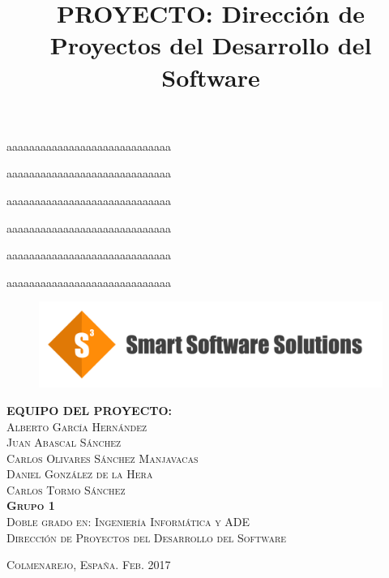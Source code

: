 \title{PROYECTO: Dirección de Proyectos del Desarrollo del Software} %

\begin{titlingpage}
\begin{center}


\color{fondo}
\par aaaaaaaaaaaaaaaaaaaaaaaaaaaaa
\par aaaaaaaaaaaaaaaaaaaaaaaaaaaaa
\par aaaaaaaaaaaaaaaaaaaaaaaaaaaaa
\par aaaaaaaaaaaaaaaaaaaaaaaaaaaaa
\par aaaaaaaaaaaaaaaaaaaaaaaaaaaaa
\par aaaaaaaaaaaaaaaaaaaaaaaaaaaaa

\color{principal}

\begin{figure}[h]
\begin{center}
\includegraphics[width=1\textwidth]{s3long}
\end{center}
\end{figure}

\vfill

\textsc{\LARGE \textbf{EQUIPO DEL PROYECTO:}}\\[2em]
\textsc{\Large Alberto García Hernández}\\[1em]
\textsc{\Large Juan Abascal Sánchez}\\[1em]
\textsc{\Large Carlos Olivares Sánchez Manjavacas}\\[1em]
\textsc{\Large Daniel González de la Hera}\\[1em]
\textsc{\Large Carlos Tormo Sánchez}\\[10em]

\textsc{\large \textbf{Grupo 1}}\\[1em]

\textsc{Doble grado en: Ingeniería Informática y ADE}\\[1em]

\textsc{Dirección de Proyectos del Desarrollo del Software}\\[6em]


\end{center}

\textsc{Colmenarejo, España. \hspace*{\fill} Feb. 2017}


\end{titlingpage}
